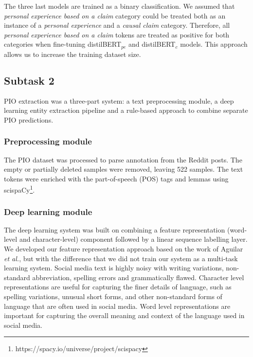 \documentclass[11pt]{article}
\begin{document}
The three last models are trained as a binary classification. 
We assumed that \emph{personal experience based on a claim} category could be treated both as an instance of a \emph{personal experience} and a \emph{causal claim} category. 
Therefore, all \emph{personal experience based on a claim} tokens are treated as positive for both categories when fine-tuning distilBERT$_{pe}$ and distilBERT$_c$ models.
This approach allows us to increase the training dataset size.
%
%
%
\subsection{Subtask 2}
\label{system:task2}
%
PIO extraction was a three-part system: a text preprocessing module, a deep learning entity extraction pipeline and a rule-based approach to combine separate PIO predictions.
%
%
%
\subsubsection{Preprocessing module}
\label{subsec:t2_preprocess}
%
The PIO dataset was processed to parse annotation from the Reddit posts.
The empty or partially deleted samples were removed, leaving 522 samples.
The text tokens were enriched with the part-of-speech (POS) tags and lemmas using scispaCy\footnote{https://spacy.io/universe/project/scispacy}.
%
%
%
\subsubsection{Deep learning module}
\label{subsec:t2_dl}
%
The deep learning system was built on combining a feature representation (word-level and character-level) component followed by a linear sequence labelling layer.
We developed our feature representation approach based on the work of Aguilar \textit{et al.}, but with the difference that we did not train our system as a multi-task learning system.
Social media text is highly noisy with writing variations, non-standard abbreviation, spelling errors and grammatically flawed.
Character level representations are useful for capturing the finer details of language, such as spelling variations, unusual short forms, and other non-standard forms of language that are often used in social media. 
Word level representations are important for capturing the overall meaning and context of the language used in social media. 
%
%
%
\end{document}
